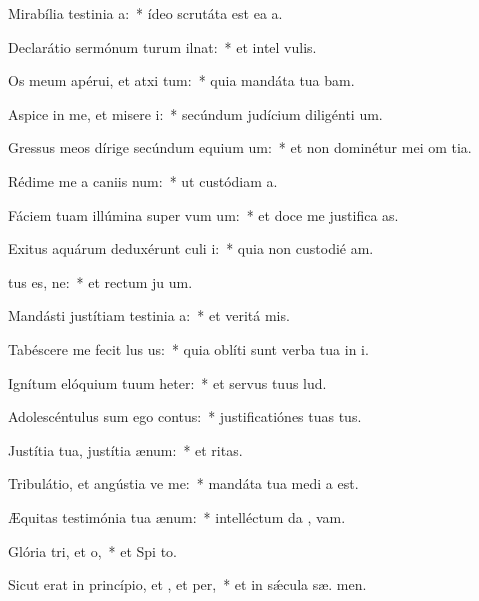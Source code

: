\item Mirabília testinia a:~* ídeo scrutáta est ea  a.
\item Declarátio sermónum turum ilnat:~* et intel  vulis.
\item Os meum apérui, et atxi tum:~* quia mandáta tua bam.
\item Aspice in me, et misere i:~* secúndum judícium diligénti  um.
\item Gressus meos dírige secúndum equium um:~* et non dominétur mei om tia.
\item Rédime me a caniis num:~* ut custódiam  a.
\item Fáciem tuam illúmina super vum um:~* et doce me justifica as.
\item Exitus aquárum deduxérunt culi i:~* quia non custodié  am.
\item {}tus es, ne:~* et rectum ju um.
\item Mandásti justítiam testinia a:~* et veritá  mis.
\item Tabéscere me fecit lus us:~* quia oblíti sunt verba tua in i.
\item Ignítum elóquium tuum heter:~* et servus tuus  lud.
\item Adolescéntulus sum ego  contus:~* justificatiónes tuas   tus.
\item Justítia tua, justítia  ænum:~* et   ritas.
\item Tribulátio, et angústia ve me:~* mandáta tua medi a est.
\item Æquitas testimónia tua  ænum:~* intelléctum da ,  vam.
\item Glória tri, et o,~* et Spi to.
\item Sicut erat in princípio, et , et per,~* et in sǽcula sæ. men.
